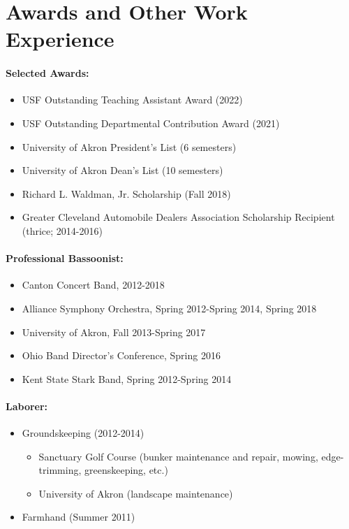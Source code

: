 \documentclass{my_cv}
\begin{document}
\section{Awards and Other Work Experience}

\paragraph{Selected Awards:}
\begin{itemize}
    \item USF Outstanding Teaching Assistant Award (2022)
    \item USF Outstanding Departmental Contribution Award (2021)
    \item University of Akron President's List (6 semesters)
    \item University of Akron Dean's List (10 semesters)
    \item Richard L. Waldman, Jr. Scholarship (Fall 2018)
    \item Greater Cleveland Automobile Dealers Association Scholarship Recipient (thrice; 2014-2016)
\end{itemize}

\paragraph{Professional Bassoonist:}
\begin{itemize}
	\item Canton Concert Band, 2012-2018
	\item Alliance Symphony Orchestra, Spring 2012-Spring 2014, Spring 2018
    \item University of Akron, Fall 2013-Spring 2017
	\item Ohio Band Director’s Conference, Spring 2016
	\item Kent State Stark Band, Spring 2012-Spring 2014
\end{itemize}

\paragraph{Laborer:}
\begin{itemize}
    \item Grounds\-keeping (2012-2014)
    \begin{itemize}
        \item Sanctuary Golf Course (bunker maintenance and repair, mowing, edge-trimming, greens\-keeping, etc.)
        \item University of Akron (landscape maintenance)
    \end{itemize}
    \item Farmhand (Summer 2011)
\end{itemize}
\end{document}
